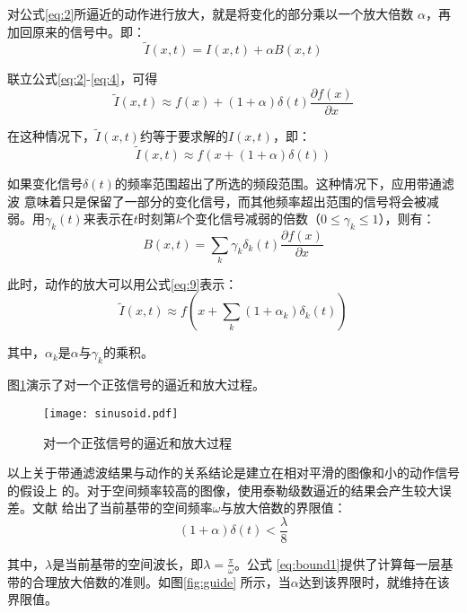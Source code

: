 对公式\ref{eq:2}所逼近的动作进行放大，就是将变化的部分乘以一个放大倍数
$\alpha$，再加回原来的信号中。即：
\begin{equation}
  \label{eq:5}
  \tilde{I}(x,t)=I(x,t)+\alpha B(x,t)
\end{equation}

联立公式\ref{eq:2}-\ref{eq:4}，可得
\begin{equation}
  \label{eq:6}
  \tilde{I}(x,t)\approx f(x)+(1+\alpha)\delta(t)\frac{\partial f(x)}{\partial x}
\end{equation}

在这种情况下，$\tilde{I}(x,t)$约等于要求解的$I(x,t)$，即：
\begin{equation}
  \label{eq:7}
  \tilde{I}(x,t)\approx f(x+(1+\alpha)\delta(t))
\end{equation}

如果变化信号$\delta(t)$的频率范围超出了所选的频段范围。这种情况下，应用带通滤波
意味着只是保留了一部分的变化信号，而其他频率超出范围的信号将会被减弱。用$\gamma_k(t)$来表示在$t$时刻第$k$个变化信号减弱的倍数（$0\le \gamma_k \le
1$），则有：
\begin{equation}
    \label{eq:8}
    B(x,t) = \sum_k \gamma_{k}\delta_{k}(t)\frac{\partial f(x)}{\partial x}
\end{equation}

此时，动作的放大可以用公式\ref{eq:9}表示：
\begin{equation}
  \label{eq:9}
  \tilde {I}(x,t)\approx f(x+\sum_k(1+\alpha_{k})\delta_{k}(t))
\end{equation}

其中，$\alpha_k$是$\alpha$与$\gamma_{k}$的乘积。

图\ref{fig:sinusoid}演示了对一个正弦信号的逼近和放大过程。

\begin{figure}[htbp]
  \centering
  \texttt{[image: sinusoid.pdf]}
  \caption{对一个正弦信号的逼近和放大过程}
  \label{fig:sinusoid}
\end{figure}

以上关于带通滤波结果与动作的关系结论是建立在相对平滑的图像和小的动作信号的假设上
的。对于空间频率较高的图像，使用泰勒级数逼近的结果会产生较大误差。文献
\cite{wu2012eulerian}给出了当前基带的空间频率$\omega$与放大倍数的界限值：
\begin{equation}
  \label{eq:bound1}
  (1+\alpha)\delta(t)<\frac{\lambda}{8}
\end{equation}

其中，$\lambda$是当前基带的空间波长，即$\lambda=\frac{\pi}{\omega}$。公式
\ref{eq:bound1}提供了计算每一层基带的合理放大倍数的准则。如图\ref{fig:guide}
所示，当$\alpha$达到该界限时，就维持在该界限值。

